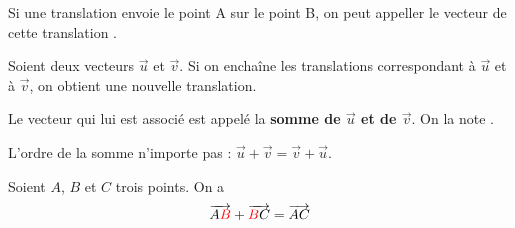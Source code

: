 \documentclass[
	classe=$2^{de}$,
	headerTitle=Généralités\space sur\space les\space vecteurs
]{coursclass}
\begin{document}
\begin{vocabulaire}
	\begin{center}
	\end{center}

	Si une translation envoie le point A sur le point B, on peut appeller le vecteur de cette translation .
\end{vocabulaire}

\begin{definition}
	Soient deux vecteurs $\vec{u}$ et $\vec{v}$. Si on enchaîne les translations correspondant à $\vec{u}$ et à $\vec{v}$, on obtient une nouvelle translation.

	Le vecteur qui lui est associé est appelé la \textbf{somme de $\vec{u}$ et de $\vec{v}$}. On la note .
\end{definition}

\begin{exemple}
	\begin{center}
	\end{center}
\end{exemple}

\begin{remarque}
	L'ordre de la somme n'importe pas : $\vec{u} + \vec{v} = \vec{v} + \vec{u}$.
\end{remarque}

\begin{propriete}
	Soient $A$, $B$ et $C$ trois points. On a
	$$ \overrightarrow{A{\color{red}B}} + \overrightarrow{{\color{red}B}C} = \overrightarrow{AC} $$
\end{propriete}
\end{document}

